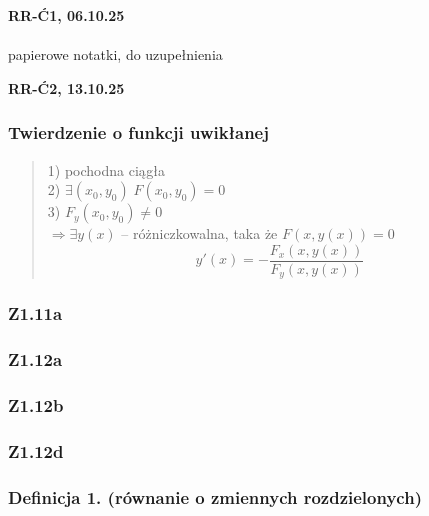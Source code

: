 \documentclass[10pt,a4paper]{article}
\newcommand{\zagadnienie}[3]{%
    \clearpage %
    \noindent\textbf{#1} #2\\
    #3
}
\begin{document}
\zagadnienie{RR-Ć1, 06.10.25}{}
{
    \\papierowe notatki, do uzupełnienia
}
\zagadnienie{RR-Ć2, 13.10.25}{}
{
    \begin{tcolorbox}[mybox]
    \subsubsection*{Twierdzenie o funkcji uwikłanej}
    \begin{quote}
        1) pochodna ciągła \\
        2) \(\exists (x_0, y_0)\; F(x_0, y_0) = 0\) \\
        3) \(F_y{(x_0, y_0)} \neq 0\) \\
        \(\Rightarrow \exists y(x)\) – różniczkowalna, taka że \(F(x, y(x)) = 0\) \\
        \[
        y'(x) = -\frac{F_x(x, y(x))}{F_y(x, y(x))}
        \]
    \end{quote}
    \end{tcolorbox}

    \subsubsection*{Z1.11a}
    \begin{quote}
    \end{quote}

    \subsubsection*{Z1.12a}
    \begin{quote}
    \end{quote}
        
    \subsubsection*{Z1.12b}
    \begin{quote}
    \end{quote}

    \subsubsection*{Z1.12d}
    \begin{quote}
    \end{quote}

    \begin{tcolorbox}[mybox]
    \subsubsection*{Definicja 1. (równanie o zmiennych rozdzielonych)}
    \begin{quote}
    \end{quote}


\end{tcolorbox}}
\end{document}
